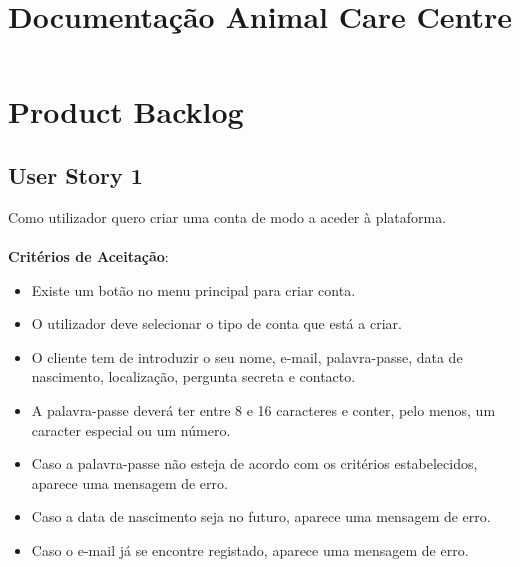 \documentclass[a4paper,11pt]{article}
\title{Documentação Animal Care Centre}
\author{}
\date{}
\begin{document}
\maketitle
\vspace{-67pt}

\section{Product Backlog}
\subsection{User Story 1}
Como utilizador quero criar uma conta de modo a aceder à plataforma.\\\\
\textbf{Critérios de Aceitação}:
\begin{itemize}
  \item Existe um botão no menu principal para criar conta.
  \item O utilizador deve selecionar o tipo de conta que está a criar.
  \item O cliente tem de introduzir o seu nome, e-mail, palavra-passe, data de nascimento, localização, pergunta secreta e contacto.
  \item A palavra-passe deverá ter entre 8 e 16 caracteres e conter, pelo menos, um caracter especial ou um número.
  \item Caso a palavra-passe não esteja de acordo com os critérios estabelecidos, aparece uma mensagem de erro.
  \item Caso a data de nascimento seja no futuro, aparece uma mensagem de erro.
  \item Caso o e-mail já se encontre registado, aparece uma mensagem de erro.
\end{itemize}
\end{document}
